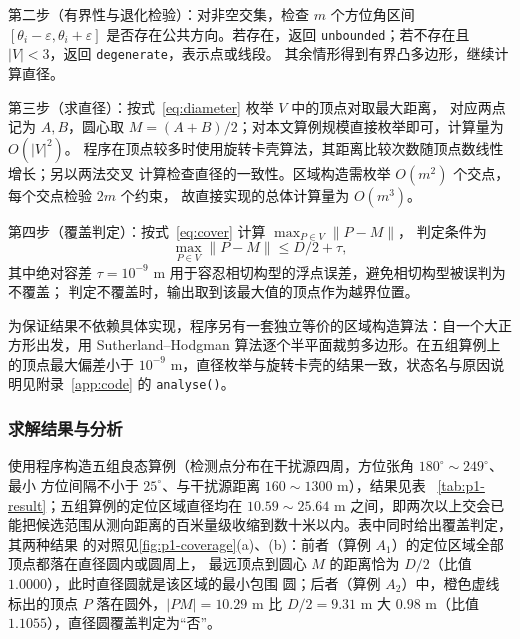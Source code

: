 {\heiti 第二步（有界性与退化检验）：}\songti 对非空交集，检查 $m$ 个方位角区间
$[\theta_i-\varepsilon,\theta_i+\varepsilon]$ 是否存在公共方向。若存在，返回
\texttt{unbounded}；若不存在且 $|V|<3$，返回 \texttt{degenerate}，表示点或线段。
其余情形得到有界凸多边形，继续计算直径。

{\heiti 第三步（求直径）：}\songti 按式~\eqref{eq:diameter} 枚举 $V$ 中的顶点对取最大距离，
对应两点记为 $A,B$，圆心取 $M=(A+B)/2$；对本文算例规模直接枚举即可，计算量为 $O(|V|^2)$。
程序在顶点较多时使用旋转卡壳算法，其距离比较次数随顶点数线性增长；另以两法交叉
计算检查直径的一致性。区域构造需枚举 $O(m^2)$ 个交点，每个交点检验 $2m$ 个约束，
故直接实现的总体计算量为 $O(m^3)$。

{\heiti 第四步（覆盖判定）：}\songti 按式~\eqref{eq:cover} 计算 $\max_{P\in V}\|P-M\|$，
判定条件为
\begin{equation}
\max_{P\in V}\|P-M\|\le D/2+\tau ,
\label{eq:cover-tol}
\end{equation}
其中绝对容差 $\tau=10^{-9}$ m 用于容忍相切构型的浮点误差，避免相切构型被误判为不覆盖；
判定不覆盖时，输出取到该最大值的顶点作为越界位置。

为保证结果不依赖具体实现，程序另有一套独立等价的区域构造算法：自一个大正方形出发，用
Sutherland--Hodgman 算法逐个半平面裁剪多边形。在五组算例上的顶点最大偏差小于
$10^{-9}$ m，直径枚举与旋转卡壳的结果一致，状态名与原因说明见附录~\ref{app:code} 的 \texttt{analyse()}。

\subsubsection{求解结果与分析}
使用程序构造五组良态算例（检测点分布在干扰源四周，方位张角 $180^\circ\sim249^\circ$、最小
方位间隔不小于 $25^\circ$、与干扰源距离 $160\sim1300$ m），结果见表
~\ref{tab:p1-result}；五组算例的定位区域直径均在 $10.59\sim25.64$ m 之间，即两次以上交会已
能把候选范围从测向距离的百米量级收缩到数十米以内。表中同时给出覆盖判定，其两种结果
的对照见\cref{fig:p1-coverage}(a)、(b)：前者（算例 $A_1$）的定位区域全部顶点都落在直径圆内或圆周上，
最远顶点到圆心 $M$ 的距离恰为 $D/2$（比值 $1.0000$），此时直径圆就是该区域的最小包围
圆；后者（算例 $A_2$）中，橙色虚线标出的顶点 $P$ 落在圆外，$|PM|=10.29$ m 比
$D/2=9.31$ m 大 $0.98$ m（比值 $1.1055$），直径圆覆盖判定为“否”。

